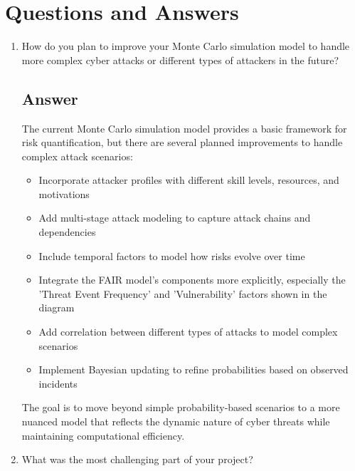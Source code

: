 \section{Questions and Answers}
\begin{enumerate}
    \item How do you plan to improve your Monte Carlo simulation model to handle more complex cyber attacks or different types of attackers in the future?
    
    \subsection*{Answer}
The current Monte Carlo simulation model provides a basic framework for risk quantification, 
    but there are several planned improvements to handle complex attack scenarios:
    
    \begin{itemize}
        \item Incorporate attacker profiles with different skill levels, resources, and motivations
        \item Add multi-stage attack modeling to capture attack chains and dependencies
        \item Include temporal factors to model how risks evolve over time
        \item Integrate the FAIR model's components more explicitly, especially the 'Threat Event Frequency' 
              and 'Vulnerability' factors shown in the diagram
        \item Add correlation between different types of attacks to model complex scenarios
        \item Implement Bayesian updating to refine probabilities based on observed incidents
    \end{itemize}
    
    The goal is to move beyond simple probability-based scenarios to a more nuanced model that 
    reflects the dynamic nature of cyber threats while maintaining computational efficiency.


    \item    What was the most challenging part of your project?

\end{enumerate}


% 
